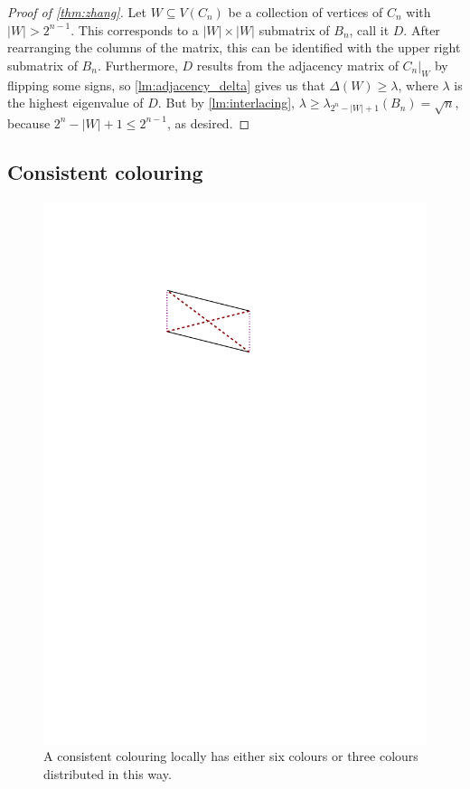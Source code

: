 \documentclass[12pt]{amsart}
\theoremstyle{definition}
\begin{document}
\begin{proof}[Proof of \cref{thm:zhang}]
Let $W \subseteq V(C_n)$ be a collection of vertices of $C_n$ with $|W| > 2^{n-1}$.
This corresponds to a $|W|\times |W|$ submatrix of $B_n$, call it $D$.
After rearranging the columns of the matrix, this can be identified with the upper right submatrix of $B_n$.
Furthermore, $D$ results from the adjacency matrix of $C_n|_W$ by flipping some signs, so \cref{lm:adjacency_delta} gives us that $\Delta(W) \geq \lambda$, where $\lambda $ is the highest eigenvalue of $D$.
But by \cref{lm:interlacing}, $\lambda \geq \lambda_{2^n - |W| + 1}(B_n) = \sqrt{n}$, because $2^n - |W| + 1 \leq 2^{n-1}$, as desired.
\end{proof}

%

\subsection{Consistent colouring}



\begin{figure}[h]
\includegraphics[scale=1]{../imgs/consistent_colouring}%
\caption{A consistent colouring locally has either six colours or three colours distributed in this way.\label{fig:consistent_colouring}}
\end{figure}
\end{document}

